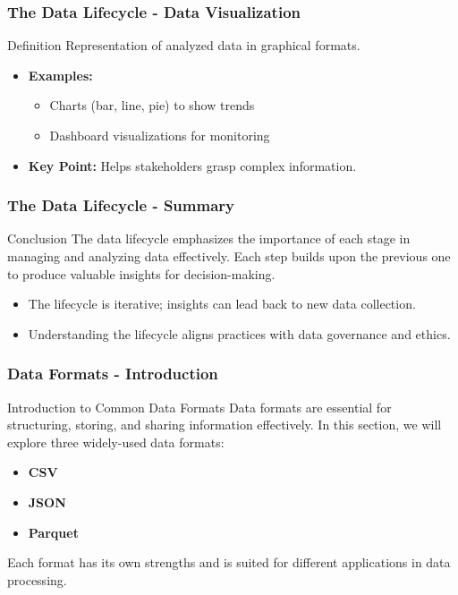 \documentclass[aspectratio=169]{beamer}
\begin{document}
\begin{frame}[fragile]
    \frametitle{The Data Lifecycle - Data Visualization}
    \begin{block}{Definition}
        Representation of analyzed data in graphical formats.
    \end{block}
    \begin{itemize}
        \item \textbf{Examples:}
        \begin{itemize}
            \item Charts (bar, line, pie) to show trends
            \item Dashboard visualizations for monitoring
        \end{itemize}
        \item \textbf{Key Point:} Helps stakeholders grasp complex information.
    \end{itemize}
\end{frame}

\begin{frame}[fragile]
    \frametitle{The Data Lifecycle - Summary}
    \begin{block}{Conclusion}
        The data lifecycle emphasizes the importance of each stage in 
        managing and analyzing data effectively. Each step builds upon the 
        previous one to produce valuable insights for decision-making.
    \end{block}
    \begin{itemize}
        \item The lifecycle is iterative; insights can lead back to new data collection.
        \item Understanding the lifecycle aligns practices with data governance and ethics.
    \end{itemize}
\end{frame}

\begin{frame}[fragile]
    \frametitle{Data Formats - Introduction}
    \begin{block}{Introduction to Common Data Formats}
        Data formats are essential for structuring, storing, and sharing information effectively. In this section, we will explore three widely-used data formats:
        \begin{itemize}
            \item \textbf{CSV}
            \item \textbf{JSON}
            \item \textbf{Parquet}
        \end{itemize}
        Each format has its own strengths and is suited for different applications in data processing.
    \end{block}
\end{frame}
\end{document}

